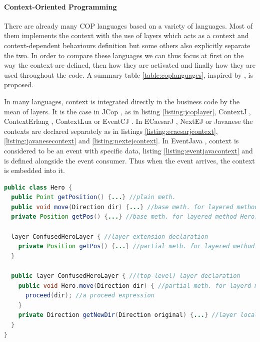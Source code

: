 \documentclass[a4paper]{article}
\begin{document}
\paragraph{Context-Oriented Programming}
There are already many COP languages based on a variety of languages. Most of them implements the context with the use of layers which acts as a context and context-dependent behaviours definition but some others also explicitly separate the two. In order to compare these languages we can thus focus at first on the way the context are defined, then how they are activated and finally how they are used throughout the code. A summary table \ref{table:coplanguages}, inspired by \cite{appeltauer_comparison_2009}, is proposed.

In many languages, context is integrated directly in the business code by the mean of layers. It is the case in JCop \cite{appeltauer_declarative_2012}, as in listing \ref{listing:jcoplayer}, ContextJ \cite{appeltauer_dedicated_2008} \cite{appeltauer_improving_2009}, ContextErlang \cite{ghezzi_context_2010}, ContextLua \cite{wasty_contextlua:_2010} or EventCJ \cite{kamina_eventcj:_2011}. In ECaesarJ \cite{nunez_declarative_2009}, NextEJ \cite{kamina_towards_2009} or Javanese \cite{kamina_unified_2013} the contexts are declared separately as in listings \ref{listing:ecaesarjcontext}, \ref{listing:javanesecontext} and \ref{listing:nextejcontext}. In EventJava \cite{jayaram_context-oriented_2009}, context is considered to be an event with specific data, listing \ref{listing:eventjavacontext} and is defined alongside the event consumer. Thus when the event arrives, the context is embedded into it.

\begin{lstlisting}[float, language=Java, caption=JCop layer example, label={listing:jcoplayer}]
public class Hero {
  public Point getPosition() {...} //plain meth.
  public void move(Direction dir) {...} //base meth. for layered method Hero.move
  private Position getPos() {...} //base meth. for layered method Hero.getPos
  
  layer ConfusedHeroLayer { //layer extension declaration
    private Position getPos() {...} //partial meth. for layered method Hero.getPos
  }

  public layer ConfusedHeroLayer { //(top-level) layer declaration
    public void Hero.move(Direction dir) { //partial meth. for layerd meth. Hero.move
      proceed(dir); //a proceed expression
    }
    private Direction getNewDir(Direction original) {...} //layer local method
  }
}
\end{lstlisting}
\end{document}
